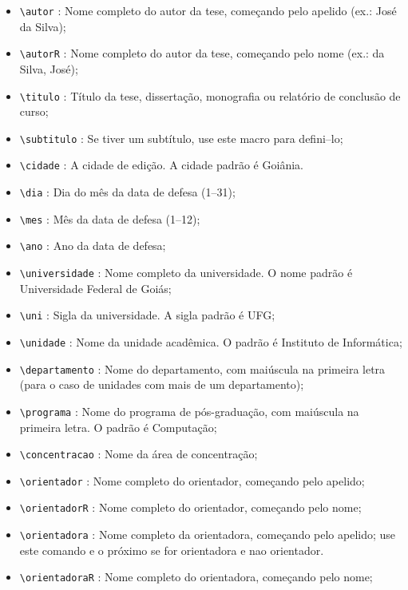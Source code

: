  \begin{itemize}%
\item \verb|\autor| : Nome completo do autor da tese, começando pelo apelido (ex.: José da Silva);
\item \verb|\autorR| : Nome completo do autor da tese, começando pelo nome (ex.: da Silva, José);
\item \verb|\titulo| : Título da tese, dissertação, monografia ou relatório de conclusão de curso;
\item \verb|\subtitulo| : Se tiver um subtítulo, use este macro para defini--lo;

\item \verb|\cidade| : A cidade de edição. A cidade padrão é \textsf{Goiânia}.
\item \verb|\dia| : Dia do mês da data de defesa (1--31);
\item \verb|\mes| : Mês da data de defesa (1--12);
\item \verb|\ano| : Ano da data de defesa;

\item \verb|\universidade| : Nome completo da universidade. O nome padrão é \textsf{Universidade Federal de Goiás};
\item \verb|\uni| : Sigla da universidade. A sigla padrão é \textsf{UFG};
\item \verb|\unidade| : Nome da unidade acadêmica. O padrão é \textsf{Instituto de Informática};
\item \verb|\departamento| : Nome do departamento, com maiúscula na primeira letra (para o caso de unidades com mais de um departamento);

\item \verb|\programa| : Nome do programa de pós-graduação, com maiúscula na primeira letra. O padrão é \textsf{Computação};
\item \verb|\concentracao| : Nome da área de concentração;

\item \verb|\orientador| : Nome completo do orientador, começando pelo apelido;
\item \verb|\orientadorR| : Nome completo do orientador, começando pelo nome;

\item \verb|\orientadora| : Nome completo da orientadora, começando pelo apelido; use este comando e o próximo se for orientadora e nao orientador.
\item \verb|\orientadoraR| : Nome completo do orientadora, começando pelo nome;


\end{itemize}

